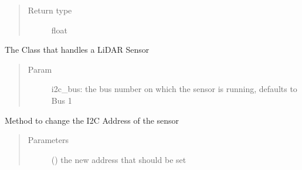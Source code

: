 \documentclass[letterpaper,10pt,english]{sphinxmanual}
\begin{document}
\begin{fulllineitems}
\begin{fulllineitems}
\begin{quote}
\begin{description}
\item[{Return type}] \leavevmode
float

\end{description}\end{quote}

\end{fulllineitems}


\end{fulllineitems}


\begin{fulllineitems}
\label{\detokenize{sensor:lib.sensor.Sensor}}
The Class that handles a LiDAR Sensor
\begin{quote}\begin{description}
\item[{Param}] \leavevmode
i2c\_bus: the bus number on which the sensor is running, defaults to Bus 1

\end{description}\end{quote}

\begin{fulllineitems}
\label{\detokenize{sensor:lib.sensor.Sensor.change_addr}}
Method to change the I2C Address of the sensor
\begin{quote}\begin{description}
\item[{Parameters}] \leavevmode
{} () \textendash{} the new address that should be set

\end{description}\end{quote}

\end{fulllineitems}



\end{fulllineitems}
\end{document}

